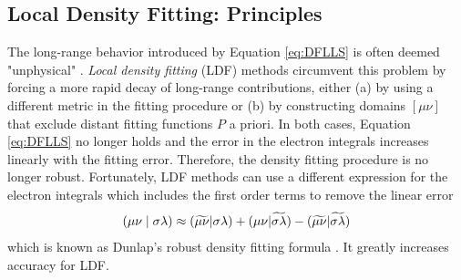 \subsection{Local Density Fitting: Principles} 
The long-range behavior introduced by Equation \ref{eq:DFLLS} is often deemed "unphysical" \cite{Tew2018}. \emph{Local density fitting} (LDF) methods circumvent this problem by forcing a more rapid decay of long-range contributions, either (a) by using a different metric in the fitting procedure or (b) by constructing domains $[\mu\nu]$ that exclude distant fitting functions $P$ a priori. In both cases, Equation \ref{eq:DFLLS} no longer holds and the error in the electron integrals increases linearly with the fitting error. Therefore, the density fitting procedure is no longer robust. Fortunately, LDF methods can use a different expression for the electron integrals which includes the first order terms to remove the linear error
\begin{equation}
\left( \mu\nu \mid \sigma\lambda \right) \approx (\widetilde{\mu\nu}|\sigma\lambda) + (\mu\nu|\widetilde{\sigma\lambda}) - (\widetilde{\mu\nu}|\widetilde{\sigma\lambda})
\label{eq:DUNLAP}
\end{equation}
\noindent which is known as Dunlap's robust density fitting formula \cite{Dun2000}. It greatly increases accuracy for LDF. 
 
